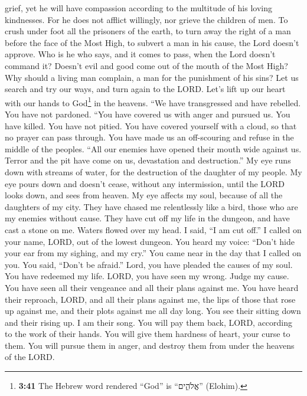 grief, yet he will have compassion according to the multitude of his
loving kindnesses.  For he does not afflict willingly,
nor grieve the children of men.  To crush under foot all
the prisoners of the earth,  to turn away the right of a
man before the face of the Most High,  to subvert a man
in his cause, the Lord doesn't approve.  Who is he who
says, and it comes to pass, when the Lord doesn't command it?
 Doesn't evil and good come out of the mouth of the Most
High?  Why should a living man complain, a man for the
punishment of his sins?  Let us search and try our ways,
and turn again to the LORD.  Let's lift up our heart with
our hands to God\footnote{\textbf{3:41} The Hebrew word rendered ``God''
  is ``אֱלֹהִ֑ים'' (Elohim).} in the heavens.  ``We have
transgressed and have rebelled. You have not pardoned. 
``You have covered us with anger and pursued us. You have killed. You
have not pitied.  You have covered yourself with a cloud,
so that no prayer can pass through.  You have made us an
off-scouring and refuse in the middle of the peoples. 
``All our enemies have opened their mouth wide against us.
 Terror and the pit have come on us, devastation and
destruction.''  My eye runs down with streams of water,
for the destruction of the daughter of my people.  My eye
pours down and doesn't cease, without any intermission, 
until the LORD looks down, and sees from heaven.  My eye
affects my soul, because of all the daughters of my city.
 They have chased me relentlessly like a bird, those who
are my enemies without cause.  They have cut off my life
in the dungeon, and have cast a stone on me.  Waters
flowed over my head. I said, ``I am cut off.''  I called
on your name, LORD, out of the lowest dungeon.  You heard
my voice: ``Don't hide your ear from my sighing, and my cry.''
 You came near in the day that I called on you. You said,
``Don't be afraid.''  Lord, you have pleaded the causes
of my soul. You have redeemed my life.  LORD, you have
seen my wrong. Judge my cause.  You have seen all their
vengeance and all their plans against me.  You have heard
their reproach, LORD, and all their plans against me, 
the lips of those that rose up against me, and their plots against me
all day long.  You see their sitting down and their
rising up. I am their song.  You will pay them back,
LORD, according to the work of their hands.  You will
give them hardness of heart, your curse to them.  You
will pursue them in anger, and destroy them from under the heavens of
the LORD.

